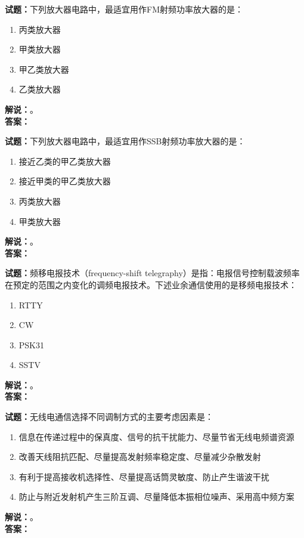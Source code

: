 \documentclass{ctexbook}
\begin{document}
\bigskip




\noindent\textbf{试题：}下列放大器电路中，最适宜用作FM射频功率放大器的是：
\begin{enumerate}[leftmargin=3em]
\item 丙类放大器
\item 甲类放大器
\item 甲乙类放大器
\item 乙类放大器
\end{enumerate}
\noindent\textbf{解说：}\textbf{}。\\\noindent\textbf{答案：}

\bigskip




\noindent\textbf{试题：}下列放大器电路中，最适宜用作SSB射频功率放大器的是：
\begin{enumerate}[leftmargin=3em]
\item 接近乙类的甲乙类放大器
\item 接近甲类的甲乙类放大器
\item 丙类放大器
\item 甲类放大器
\end{enumerate}
\noindent\textbf{解说：}\textbf{}。\\\noindent\textbf{答案：}

\bigskip




\noindent\textbf{试题：}频移电报技术（frequency-shift telegraphy）是指：电报信号控制载波频率在预定的范围之内变化的调频电报技术。下述业余通信使用的是移频电报技术：
\begin{enumerate}[leftmargin=3em]
\item RTTY
\item CW
\item PSK31
\item SSTV
\end{enumerate}
\noindent\textbf{解说：}\textbf{}。\\\noindent\textbf{答案：}

\bigskip




\noindent\textbf{试题：}无线电通信选择不同调制方式的主要考虑因素是：
\begin{enumerate}[leftmargin=3em]
\item 信息在传递过程中的保真度、信号的抗干扰能力、尽量节省无线电频谱资源
\item 改善天线阻抗匹配、尽量提高发射频率稳定度、尽量减少杂散发射
\item 有利于提高接收机选择性、尽量提高话筒灵敏度、防止产生谐波干扰
\item 防止与附近发射机产生三阶互调、尽量降低本振相位噪声、采用高中频方案
\end{enumerate}
\noindent\textbf{解说：}\textbf{}。\\\noindent\textbf{答案：}
\end{document}
